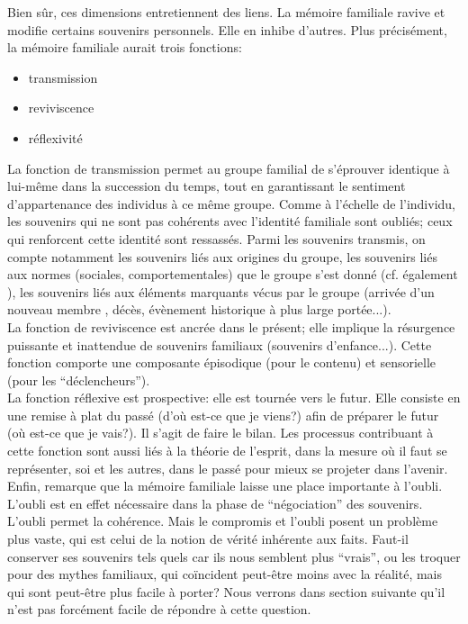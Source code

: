\documentclass[french]{article}
\begin{document}
			Bien sûr, ces dimensions entretiennent des liens. La mémoire familiale ravive et modifie certains souvenirs personnels. Elle en inhibe d'autres. Plus précisément, la mémoire familiale aurait trois fonctions:
			\begin{itemize}
				\item transmission
				\item reviviscence
				\item réflexivité
			\end{itemize}
			La fonction de transmission permet au groupe familial de s'éprouver identique à lui-même dans la succession du temps, tout en garantissant le sentiment d'appartenance des individus à ce même groupe. Comme à l'échelle de l'individu, les souvenirs qui ne sont pas cohérents avec l'identité familiale sont oubliés; ceux qui renforcent cette identité sont ressassés. Parmi les souvenirs transmis, on compte notamment les souvenirs liés aux origines du groupe, les souvenirs liés aux normes (sociales, comportementales) que le groupe s'est donné (cf. également \cite[p.~110-111]{halbwachs1925}), les souvenirs liés aux éléments marquants vécus par le groupe (arrivée d'un nouveau membre \cite[p.~121]{halbwachs1925}, décès, évènement historique à plus large portée...).\\
			La fonction de reviviscence est ancrée dans le présent; elle implique la résurgence puissante et inattendue de souvenirs familiaux (souvenirs d'enfance...). Cette fonction comporte une composante épisodique (pour le contenu) et sensorielle (pour les ``déclencheurs'').\\
			La fonction réflexive est prospective: elle est tournée vers le futur. Elle consiste en une remise à plat du passé (d'où est-ce que je viens?) afin de préparer le futur (où est-ce que je vais?). Il s'agit de faire le bilan. Les processus contribuant à cette fonction sont aussi liés à la théorie de l'esprit, dans la mesure où il faut se représenter, soi et les autres, dans le passé pour mieux se projeter dans l'avenir. \\
			
			Enfin, \cite{muxel2012} remarque que la mémoire familiale laisse une place importante à l'oubli. L'oubli est en effet nécessaire dans la phase de ``négociation'' des souvenirs. L'oubli permet la cohérence. Mais le compromis et l'oubli posent un problème plus vaste, qui est celui de la notion de vérité inhérente aux faits. Faut-il conserver ses souvenirs tels quels car ils nous semblent plus ``vrais'', ou les troquer pour des mythes familiaux, qui coïncident peut-être moins avec la réalité, mais qui sont peut-être plus facile à porter? Nous verrons dans section suivante qu'il n'est pas forcément facile de répondre à cette question.
			
\end{document}
